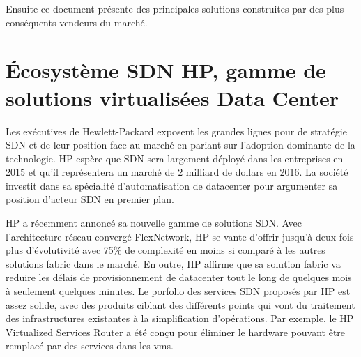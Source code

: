 Ensuite ce document présente des principales solutions construites par des plus conséquents vendeurs du marché.



\section{Écosystème SDN HP, gamme de solutions virtualisées Data Center}


Les exécutives de Hewlett-Packard exposent les grandes lignes pour de stratégie SDN et de leur position face au marché en pariant sur l'adoption dominante de la technologie. HP espère que SDN sera largement déployé dans les entreprises en 2015 et qu'il représentera un marché de 2 milliard de dollars en 2016. La société investit dans sa spécialité d'automatisation de \gls{datacenter} pour argumenter sa position d'acteur SDN en premier plan. \cite{ExecutiveGuideToSDNHP}


HP a récemment annoncé sa nouvelle gamme de solutions SDN. Avec l'architecture réseau convergé FlexNetwork, HP se vante d'offrir jusqu'à deux fois plus d'évolutivité avec 75\% de complexité en moins si comparé à les autres solutions fabric dans le marché. En outre, HP affirme que sa solution fabric va reduire les délais de provisionnement de \gls{datacenter} tout le long de quelques mois à seulement quelques minutes. Le porfolio des services SDN proposés par HP est assez solide, avec des produits ciblant des différents points qui vont du traitement des infrastructures existantes à la simplification d'opérations. Par exemple, le HP Virtualized Services Router a été conçu pour éliminer le hardware pouvant être remplacé par des services dans les \glspl{vm}.  



